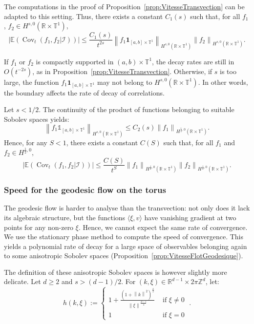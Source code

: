 \documentclass[AHL,Unicode,longabstracts]{cedram}
\DeclareMathOperator{\Cov}{Cov}
\newcommand{\Z}{\mathbb{Z}}
\newcommand{\R}{\mathbb{R}}
\newcommand{\Ebb}{\mathbb{E}}
\newcommand{\Tbb}{\mathbb{T}}
\newcommand{\Ical}{\mathcal{I}}
\newcommand{\norm}[2]{\left\| #1 \right\|_{#2}}
\newcommand*{\un}{\mathds{1}}
\begin{document}

The computations in the proof of Proposition~\ref{prop:VitesseTransvection} can be adapted to this setting. Thus, there exists a constant $C_1(s)$ such that, for all $f_1$, $f_2 \in H^{s,0} (\R \times \Tbb^1)$,
\[
\big| \Ebb (\Cov_t (f_1, f_2|\Ical)) \big|
\leq \frac{C_1(s)}{t^{2s}} \norm{f_1 \mathbf{1}_{[a, b]\times \Tbb^1}}{H^{s,0} (\R \times \Tbb^1)} \norm{f_2}{H^{s,0} (\R \times \Tbb^1)}.
\]

If $f_1$ or $f_2$ is compactly supported in $(a,b)\times \Tbb^1$, the decay rates are still in $O (t^{-2s})$, as in Proposition~\ref{prop:VitesseTransvection}. Otherwise, if $s$ is too large, the function $f_1 \mathbf{1}_{[a, b]\times \Tbb^1}$ may not belong to $H^{s,0} (\R \times \Tbb^1)$. In other words, the boundary affects the rate of decay of correlations.


Let $s < 1/2$. The continuity of the product of functions belonging to suitable Sobolev spaces yields:
\[
\norm{f_1 \un_{[a, b]\times \Tbb^1}}{H^{s,0} (\R \times \Tbb^1)}
\leq C_2(s) \norm{f_1}{H^{\frac{1}{2},0} (\R \times \Tbb^1)}.
\]
Hence, for any $S <1$, there exists a constant $C(S)$ such that, for all $f_1$ and $f_2 \in H^{\frac{1}{2},0}$,
\[
\big| \Ebb (\Cov_t (f_1, f_2|\Ical)) \big|
\leq \frac{C(S)}{t^S} \norm{f_1}{H^{\frac{1}{2},0} (\R \times \Tbb^1)} \norm{f_2}{H^{\frac{1}{2},0} (\R \times \Tbb^1)}.
\]


\subsubsection{Speed for the geodesic flow on the torus}\label{subsubsec:VitesseTore}


The geodesic flow is harder to analyse than the transvection: not only does it lack its algebraic structure, but the functions $\langle \xi, v \rangle$ have vanishing gradient at two points for any non-zero $\xi$. Hence, we cannot expect the same rate of convergence. We use the stationary phase method to compute the speed of convergence. This yields a polynomial rate of decay for a large space of observables belonging again to some anisotropic Sobolev spaces (Proposition~\ref{prop:VitesseFlotGeodesique}).


The definition of these anisotropic Sobolev spaces is however slightly more delicate. Let $d \geq 2$ and $s>(d-1)/2$. For $(k, \xi) \in \R^{d-1} \times 2 \pi \Z^d$, let:
\[
h (k,\xi) :=
\begin{cases}
1+\frac{(1+\norm{k}{}^2)^{\frac{s}{2}}}{\norm{\xi}{}^{\frac{d-1}{4}}} & \text{ if }  \xi \neq 0 \\
1 & \text{ if } \xi = 0
\end{cases}
\;.
\]
\end{document}
